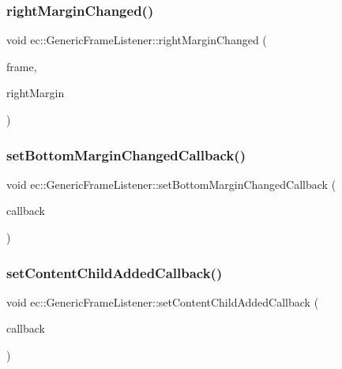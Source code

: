 \subsubsection{\texorpdfstring{right\+Margin\+Changed()}{rightMarginChanged()}}
{\footnotesize\ttfamily void ec\+::\+Generic\+Frame\+Listener\+::right\+Margin\+Changed (\begin{DoxyParamCaption}\item[{agui\+::\+Frame $\ast$}]{frame,  }\item[{int}]{right\+Margin }\end{DoxyParamCaption})\hspace{0.3cm}{\ttfamily [override]}}

\mbox{\label{classec_1_1_generic_frame_listener_a110ef9d908ae2a711f3d21b555902a5c}} 
\subsubsection{\texorpdfstring{set\+Bottom\+Margin\+Changed\+Callback()}{setBottomMarginChangedCallback()}}
{\footnotesize\ttfamily void ec\+::\+Generic\+Frame\+Listener\+::set\+Bottom\+Margin\+Changed\+Callback (\begin{DoxyParamCaption}\item[{const \mbox{\hyperlink{classec_1_1_generic_frame_listener_aadeca32c32883e7951bd27b6a9a9d06a}{Bottom\+Margin\+Changed\+\_\+\+Callback}} \&}]{callback }\end{DoxyParamCaption})}

\mbox{\label{classec_1_1_generic_frame_listener_abc0e2510ddf60f31fffbf8cd8205d7e5}} 
\subsubsection{\texorpdfstring{set\+Content\+Child\+Added\+Callback()}{setContentChildAddedCallback()}}
{\footnotesize\ttfamily void ec\+::\+Generic\+Frame\+Listener\+::set\+Content\+Child\+Added\+Callback (\begin{DoxyParamCaption}\item[{const \mbox{\hyperlink{classec_1_1_generic_frame_listener_a60609130cab4035d4dd9315cca67e7e9}{Content\+Child\+Added\+\_\+\+Callback}} \&}]{callback }\end{DoxyParamCaption})}

